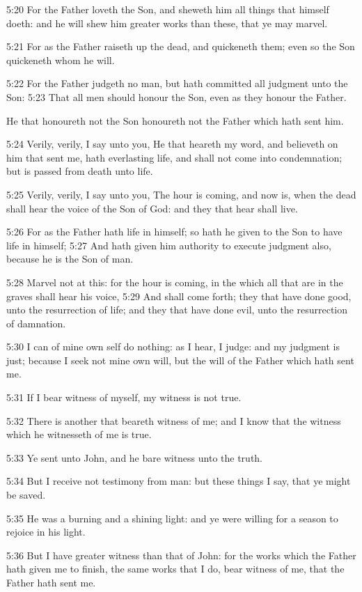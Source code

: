 5:20 For the Father loveth the Son, and sheweth him all things that himself doeth: and he will shew him greater works than these, that ye may marvel.

5:21 For as the Father raiseth up the dead, and quickeneth them; even so the Son quickeneth whom he will.

5:22 For the Father judgeth no man, but hath committed all judgment unto the Son: 5:23 That all men should honour the Son, even as they honour the Father.

He that honoureth not the Son honoureth not the Father which hath sent him.

5:24 Verily, verily, I say unto you, He that heareth my word, and believeth on him that sent me, hath everlasting life, and shall not come into condemnation; but is passed from death unto life.

5:25 Verily, verily, I say unto you, The hour is coming, and now is, when the dead shall hear the voice of the Son of God: and they that hear shall live.

5:26 For as the Father hath life in himself; so hath he given to the Son to have life in himself; 5:27 And hath given him authority to execute judgment also, because he is the Son of man.

5:28 Marvel not at this: for the hour is coming, in the which all that are in the graves shall hear his voice, 5:29 And shall come forth; they that have done good, unto the resurrection of life; and they that have done evil, unto the resurrection of damnation.

5:30 I can of mine own self do nothing: as I hear, I judge: and my judgment is just; because I seek not mine own will, but the will of the Father which hath sent me.

5:31 If I bear witness of myself, my witness is not true.

5:32 There is another that beareth witness of me; and I know that the witness which he witnesseth of me is true.

5:33 Ye sent unto John, and he bare witness unto the truth.

5:34 But I receive not testimony from man: but these things I say, that ye might be saved.

5:35 He was a burning and a shining light: and ye were willing for a season to rejoice in his light.

5:36 But I have greater witness than that of John: for the works which the Father hath given me to finish, the same works that I do, bear witness of me, that the Father hath sent me.

